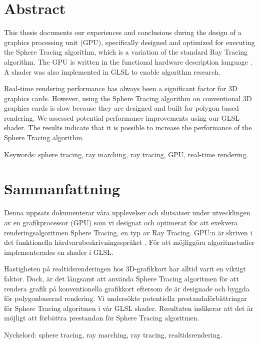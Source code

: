 \thispagestyle{plain}			%
\setlength{\parskip}{10pt}
\setlength{\parindent}{0pt}

\section*{Abstract}



	This thesis documents our experiences and conclusions during the design of a
	graphics processing unit (GPU), specifically designed and optimized for
	executing the Sphere Tracing algorithm, which is a variation of the standard
	Ray Tracing algorithm. The GPU is written in the functional hardware description
	language \clash. A shader was also implemented in GLSL to enable
	algorithm research.
	
	Real-time rendering performance has always been a significant factor for 3D
	graphics cards. However, using the Sphere Tracing algorithm on conventional
	3D graphics cards is slow because they are designed and built for polygon
	based rendering. We assessed potential performance improvements using our
	GLSL shader. The results indicate that it is possible to increase the
	performance of the Sphere Tracing algorithm.

	\vfill Keywords: sphere tracing, ray marching, ray tracing, GPU, real-time
	rendering.

\newpage
\thispagestyle{plain}

\section*{Sammanfattning}
	
	Denna uppsats dokumenterar våra upplevelser och slutsatser under 
	utvecklingen av en grafikprocessor (GPU) som vi	designat och optimerat 
	för att exekvera renderingsalgoritmen Sphere Tracing, en typ av Ray 
	Tracing. GPU:n är skriven i det funktionella hårdvarubeskrivningsspråket 
	\clash. För att möjliggöra algoritmstudier implementerades en shader i GLSL.
	
	Hastigheten på realtidsrenderingen hos 3D-grafikkort har alltid varit en
	viktigt faktor. Dock, är det långsamt att använda Sphere Tracing algoritmen
	för att rendera grafik på konventionella grafikkort eftersom de är designade
	och byggda för polygonbaserad rendering. Vi undersökte potentiella
	prestandaförbättringar för Sphere Tracing algoritmen i vår GLSL shader.
	Resultaten indikerar att det är möjligt att förbättra prestandan för Sphere
	Tracing algoritmen.

	\vfill
	Nyckelord: sphere tracing, ray marching, ray tracing, realtidsrendering.


\newpage
\thispagestyle{empty}
\mbox{}
